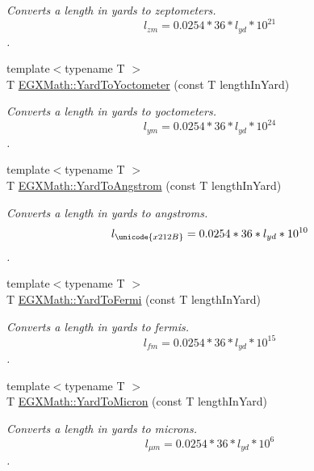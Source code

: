 \begin{DoxyCompactItemize}
\begin{DoxyCompactList}\small\item\em Converts a length in yards to zeptometers. \[ l_{zm}=0.0254 * 36 * l_{yd} * 10^{21} \]. \end{DoxyCompactList}\item 
{\footnotesize template$<$typename T $>$ }\\T \mbox{\hyperlink{group___e_g_x_math-_conversions-_length_conversions-_imperial-_yard-_s_i_gaea3e0a85c92575480e68615b7e80d26f}{E\+G\+X\+Math\+::\+Yard\+To\+Yoctometer}} (const T length\+In\+Yard)
\begin{DoxyCompactList}\small\item\em Converts a length in yards to yoctometers. \[ l_{ym}=0.0254 * 36 * l_{yd} * 10^{24} \]. \end{DoxyCompactList}\item 
{\footnotesize template$<$typename T $>$ }\\T \mbox{\hyperlink{group___e_g_x_math-_conversions-_length_conversions-_imperial-_yard-_non-_s_i_gaacff083bdc6b954da2e4b63f857cb429}{E\+G\+X\+Math\+::\+Yard\+To\+Angstrom}} (const T length\+In\+Yard)
\begin{DoxyCompactList}\small\item\em Converts a length in yards to angstroms. \[ l_{\unicode{x212B}}=0.0254 * 36 * l_{yd} * 10^{10} \]. \end{DoxyCompactList}\item 
{\footnotesize template$<$typename T $>$ }\\T \mbox{\hyperlink{group___e_g_x_math-_conversions-_length_conversions-_imperial-_yard-_non-_s_i_ga796a8607338fefb728574de07375543f}{E\+G\+X\+Math\+::\+Yard\+To\+Fermi}} (const T length\+In\+Yard)
\begin{DoxyCompactList}\small\item\em Converts a length in yards to fermis. \[ l_{fm}=0.0254 * 36 * l_{yd} * 10^{15} \]. \end{DoxyCompactList}\item 
{\footnotesize template$<$typename T $>$ }\\T \mbox{\hyperlink{group___e_g_x_math-_conversions-_length_conversions-_imperial-_yard-_non-_s_i_ga7d167f52b344853fd58dcc589e0ad301}{E\+G\+X\+Math\+::\+Yard\+To\+Micron}} (const T length\+In\+Yard)
\begin{DoxyCompactList}\small\item\em Converts a length in yards to microns. \[ l_{\mu m}=0.0254 * 36 * l_{yd} * 10^{6} \]. \end{DoxyCompactList}\item 

\end{DoxyCompactItemize}
